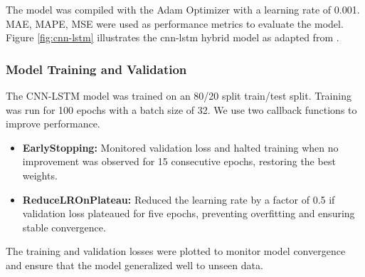 The model was compiled with the Adam Optimizer with a learning rate of 0.001. MAE, MAPE, MSE were used as performance metrics to evaluate the model. Figure \ref{fig:cnn-lstm} illustrates the cnn-lstm hybrid model as adapted from \cite{rafi2021short}.


\subsubsection{Model Training and Validation}
The CNN-LSTM model was trained on an 80/20 split train/test split. Training was run for 100 epochs with a batch size of 32. We use two callback functions to improve performance.
\begin{itemize}
	\item \textbf{EarlyStopping:} Monitored validation loss and halted training when no improvement was observed for 15 consecutive epochs, restoring the best weights.
	\item \textbf{ReduceLROnPlateau:} Reduced the learning rate by a factor of 0.5 if validation loss plateaued for five epochs, preventing overfitting and ensuring stable convergence.
\end{itemize}
The training and validation losses were plotted to monitor model convergence and ensure that the model generalized well to unseen data.
































